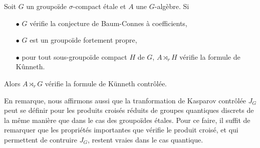 \begin{thm}
Soit $G$ un groupoïde $\sigma$-compact étale et $A$ une $G$-algèbre. Si 
\begin{itemize}
\item[$\bullet$] $G$ vérifie la conjecture de Baum-Connes à coefficients,
\item[$\bullet$] $G$ est un groupoïde fortement propre,
\item[$\bullet$] pour tout sous-groupoïde compact $H$ de $G$, $A\rtimes_r H$ vérifie la formule de Kûnneth.
\end{itemize} 
Alors $A\rtimes_r G$ vérifie la formule de Künneth contrôlée.
\end{thm}

En remarque, nous affirmons aussi que la tranformation de Kasparov contrôlée $J_G$ peut se définir pour les produits croisés réduits de groupes quantiques discrets de la même manière que dans le cas des groupoïdes étales. Pour ce faire, il suffit de remarquer que les propriétés importantes que vérifie le produit croisé, et qui permettent de contruire $J_G$, restent vraies dans le cas quantique.


































